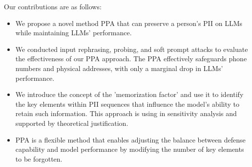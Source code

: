 Our contributions are as follows:
\begin{itemize}

\item We propose a novel method PPA that can preserve a person's PII on LLMs while maintaining LLMs' performance.
\item We conducted input rephrasing, probing, and soft prompt attacks to evaluate the effectiveness of our PPA approach. The PPA effectively safeguards phone numbers and physical addresses, with only a marginal drop in LLMs' performance.


\item We introduce the concept of the 'memorization factor' and use it to identify the key elements within PII sequences that influence the model's ability to retain such information. This approach is using in sensitivity analysis and supported by theoretical justification.
\item PPA is a flexible method that enables adjusting the balance between defense capability and model performance by modifying the number of key elements to be forgotten.



\end{itemize}







